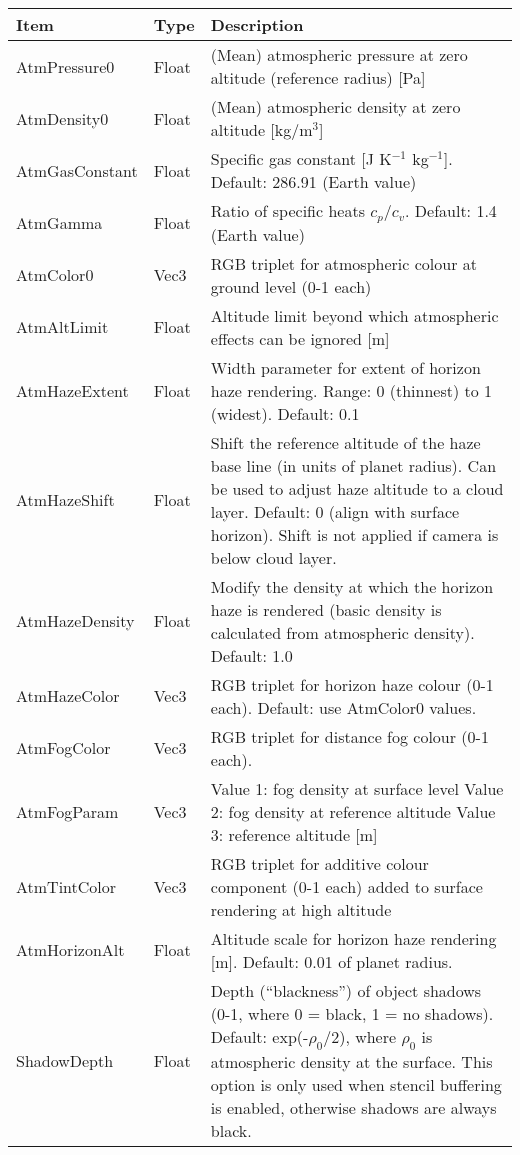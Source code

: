 \documentclass[Orbiter Developer Manual.tex]{subfiles}
\begin{document}
	\begin{longtable}{ |p{}|p{}|p{}| }
	\hline\rule{0pt}{2ex}
	\textbf{Item} & \textbf{Type} & \textbf{Description}\\
	\hline\rule{0pt}{2ex}
	AtmPressure0 & Float & (Mean) atmospheric pressure at zero altitude (reference radius) [Pa]\\
	\hline\rule{0pt}{2ex}
	AtmDensity0 & Float & (Mean) atmospheric density at zero altitude [kg/m$^{3}$]\\
	\hline\rule{0pt}{2ex}
	AtmGasConstant & Float & Specific gas constant [J K$^{-1}$ kg$^{-1}$]. Default: 286.91 (Earth value)\\
	\hline\rule{0pt}{2ex}
	AtmGamma & Float & Ratio of specific heats $c_{p}$/$c_{v}$. Default: 1.4 (Earth value)\\
	\hline\rule{0pt}{2ex}
	AtmColor0 & Vec3 & RGB triplet for atmospheric colour at ground level (0-1 each)\\
	\hline\rule{0pt}{2ex}
	AtmAltLimit & Float & Altitude limit beyond which atmospheric effects can be ignored [m]\\
	\hline\rule{0pt}{2ex}
	AtmHazeExtent & Float & Width parameter for extent of horizon haze rendering. Range: 0 (thinnest) to 1 (widest). Default: 0.1\\
	\hline\rule{0pt}{2ex}
	AtmHazeShift & Float & Shift the reference altitude of the haze base line (in units of planet radius). Can be used to adjust haze altitude to a cloud layer. Default: 0 (align with surface horizon). Shift is not applied if camera is below cloud layer.\\
	\hline\rule{0pt}{2ex}
	AtmHazeDensity & Float & Modify the density at which the horizon haze is rendered (basic density is calculated from atmospheric density). Default: 1.0\\
	\hline\rule{0pt}{2ex}
	AtmHazeColor & Vec3 & RGB triplet for horizon haze colour (0-1 each). Default: use AtmColor0 values.\\
	\hline\rule{0pt}{2ex}
	AtmFogColor & Vec3 & RGB triplet for distance fog colour (0-1 each).\\
	\hline\rule{0pt}{2ex}
	AtmFogParam & Vec3 & Value 1: fog density at surface level\newline
	Value 2: fog density at reference altitude\newline
	Value 3: reference altitude [m]\\
	\hline\rule{0pt}{2ex}
	AtmTintColor & Vec3 & RGB triplet for additive colour component (0-1 each) added to surface rendering at high altitude\\
	\hline\rule{0pt}{2ex}
	AtmHorizonAlt & Float & Altitude scale for horizon haze rendering [m]. Default: 0.01 of planet radius.\\
	\hline\rule{0pt}{2ex}
	ShadowDepth & Float & Depth (“blackness”) of object shadows (0-1, where 0 = black, 1 = no shadows). Default: exp(-$\rho_{0}$/2), where $\rho_{0}$ is atmospheric density at the surface. This option is only used when stencil buffering is enabled, otherwise shadows are always black.\\
	\hline
	\end{longtable}
\end{document}
